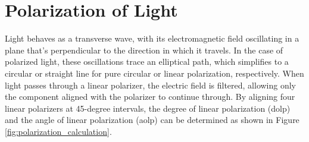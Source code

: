 \section{Polarization of Light}
Light behaves as a transverse wave, with its electromagnetic field oscillating in a plane that's perpendicular to the direction in which it travels.
In the case of polarized light, these oscillations trace an elliptical path, which simplifies to a circular or straight line for pure circular or linear polarization, respectively.
When light passes through a linear polarizer, the electric field is filtered, allowing only the component aligned with the polarizer to continue through.
By aligning four linear polarizers at 45-degree intervals, the degree of linear polarization (\gls{dolp}) and the angle of linear polarization (\gls{aolp}) can be determined as shown in Figure \ref{fig:polarization_calculation}.


